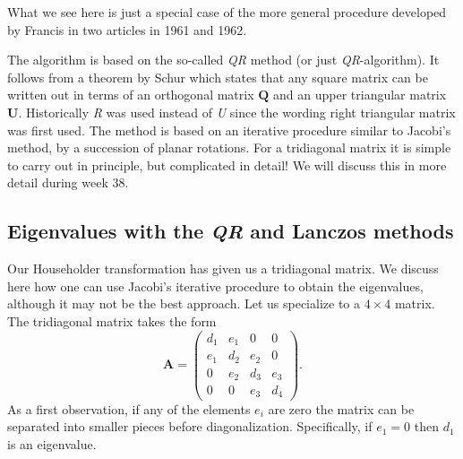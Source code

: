 \documentclass[%
oneside,                 %
final,                   %
10pt]{article}
\begin{document}
What we see here is just a special case of the more general procedure 
developed by Francis in two articles in 1961 and 1962.

The algorithm is based on the so-called \emph{QR} method (or just \emph{QR}-algorithm). It follows from a theorem by Schur which states that any square matrix can be written out in terms of an orthogonal matrix $\mathbf{Q}$ and an upper triangular matrix $\mathbf{U}$. Historically \emph{R} was used instead of 
\emph{U} since the wording right triangular matrix was first used.
The method is based on an iterative procedure similar to Jacobi's method, by a succession of
planar rotations. For a tridiagonal matrix it is simple to carry out in principle, but complicated in detail! We will discuss this in more detail during week 38.

\subsection*{Eigenvalues with the \emph{QR} and Lanczos methods}

Our Householder transformation has given us a tridiagonal matrix. We discuss here how one can use
Jacobi's iterative procedure to obtain the eigenvalues, although it may not be the best approach. 
Let us specialize to a $4\times 4 $ matrix.
The tridiagonal matrix takes the form
\[
 \mathbf{A} =
      \left( \begin{array}{cccc} 
                d_{1} & e_{1} & 0     &  0    \\
                e_{1} & d_{2} & e_{2} &  0    \\
                 0    & e_{2} & d_{3} & e_{3} \\
                 0    &   0   & e_{3} & d_{4} 
             \end{array} \right).
\]
As a first observation, if any of the elements $e_{i}$ are zero the
matrix can be separated into smaller pieces before
diagonalization. Specifically, if $e_{1} = 0$ then $d_{1}$ is an
eigenvalue.
\end{document}
